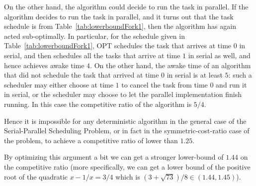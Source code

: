 On the other hand, the algorithm could decide to run the task in
parallel. If the algorithm decides to run the task in parallel,
and it turns out that the task schedule is from
Table~\ref{tab:lowerboundFork1}, then the algorithm has again
acted sub-optimally. In particular, for the schedule given in
Table~\ref{tab:lowerboundFork1}, OPT schedules the task that
arrives at time $0$ in serial, and then schedules all the tasks
that arrive at time $1$ in serial as well, and hence achieves
awake time $4$. On the other hand, the awake time of an algorithm
that did not schedule the task that arrived at time $0$ in
serial is at least $5$: such a scheduler may either choose at
time $1$ to cancel the task from time $0$ and run it in serial,
or the scheduler may choose to let the parallel implementation
finish running. In this case the competitive ratio of the
algorithm is $5/4$.

Hence it is impossible for any deterministic algorithm in the
general case of the Serial-Parallel Scheduling Problem, or in
fact in the symmetric-cost-ratio case of the problem, to achieve
a competitive ratio of lower than $1.25$.

By optimizing this argument a bit we can get a stronger
lower-bound of $1.44$ on the competitive ratio (more
specifically, we can get a lower bound of the positive root of
the quadratic $x - 1/x = 3/4$ which is $(3+\sqrt{73})/8 \in
(1.44, 1.45)$).

